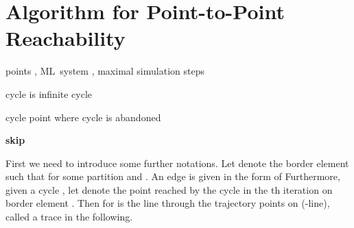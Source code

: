 \documentclass[copyright,creativecommons]{packages/eptcs}
\newcommand{\ml}{\mbox{ML}}
\newenvironment{newalgo}[2]{\begin{algorithm}
\caption{\textsc{#1}}\label{#2}
\begin{algorithmic}[1]
\vspace{0.0in}} {\end{algorithmic}\end{algorithm}}
\begin{document}
\section{Algorithm for Point-to-Point Reachability}\label{sec:algorithm}




\begin{newalgo}{Point-to-Point Reachability}{alg:ptp_reachability}
  \INPUT points , \ml~system , maximal simulation steps 
  \OUTPUT 
  
  \medskip
  
  \STATE  {}
  \STATE 
  
  \WHILE {}
    \STATE 
	  \RETURN \TRUE
	\ENDIF 
      \ENDIF {}
      
      \IF{}
	\RETURN \FALSE
      \ELSE
	\STATE 
      \ENDIF
    \ENDIF {}
  \ENDWHILE
  
  \RETURN 
\end{newalgo}


\begin{newalgo}{Infinity test}{alg:infinity}
  \INPUT cycle 
  \OUTPUT  is infinite cycle
  
  \medskip
  
  \FORALL{}
    \FORALL{}
	  \IF{}
	    \RETURN \FALSE
	  \ELSE
	    \IF{}
	      \RETURN \FALSE
	    \ENDIF
	  \ENDIF
	\ENDIF
    \ENDFOR
  \ENDFOR
  
  \RETURN \TRUE
\end{newalgo}
\begin{newalgo}{Exit point}{alg:exit_point}
  \INPUT cycle 
  \OUTPUT point  where cycle  is abandoned
  
 \medskip
  
  \STATE 
  \FORALL{}
    \IF{}
      \STATE \textbf{skip}
    \ENDIF
    
    \FORALL{}
	\STATE 
    \ENDFOR
    
    \STATE 
    \IF{}
      \STATE  \STATE 
    \ELSE
      \STATE 
    \ENDIF
    
    \STATE  \STATE 
  \ENDFOR
  
  \RETURN 
\end{newalgo}


First  we need to introduce some further notations. Let  denote the border element  such that  for some partition  and . An edge  is given in the form of  Furthermore, given a cycle , let  denote the point reached by the cycle in the th iteration on border element . Then  for  is the line through the trajectory points on  (-line), called a trace in the following.
\end{document}
